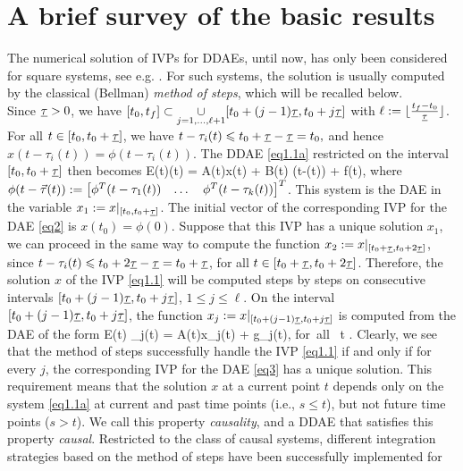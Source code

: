 \documentclass[final,reqno]{siamltex}
\begin{document}
\section{A brief survey of the basic results}
%
The numerical solution of IVPs for DDAEs, until now, has only been considered for square systems, see e.g. 
\cite{AscP95,BakPT02,CamL09,GugH07,Liu99,ShaG06,TiaYK11,ZhuP97,ZhuP98}. 
For such systems, the solution is usually computed by the classical (Bellman) \emph{method of steps}, which will be recalled below.\\
Since $\underline{\tau}>0$, we have $[t_0,t_f] \subset \underset{j=1,\dots,\ell+1}{\cup} [t_0+(j-1)\underline{\tau},t_0+j\underline{\tau}]$ 
with $\ell := \lfloor \frac{t_f-t_0}{\underline{\tau}} \rfloor$.
For all $t \in [t_0,t_0+\underline{\tau}]$, we have $t-\tau_i(t) \leqslant t_0 + \underline{\tau} - \underline{\tau} = t_0,$ and hence $x(t-\tau_i(t)) = \phi(t-\tau_i(t))$.
The DDAE \eqref{eq1.1a} restricted on the interval $[t_0,t_0+\underline{\tau}]$ then becomes
%
\be\label{eq2}
 E(t)(t) = A(t)x(t) + B(t) \phi(t-\vtau(t)) + f(t),
\ee
%
where $\phi(t-\vec{\tau}(t)) := \begin{bmatrix} \phi^T(t-\tau_1(t)) & \dots & \phi^T(t-\tau_k(t)) \end{bmatrix}^T$. 
This system is the DAE in the variable $x_1 := x|_{[t_0,t_0+\underline{\tau}]}$. The initial vector of the corresponding IVP for the DAE \eqref{eq2} is $x(t_0)=\phi(0)$.
Suppose that this IVP has a unique solution $x_1$, we can proceed in the same way to compute the function $x_2 := x|_{[t_0+\underline{\tau},t_0+2\underline{\tau}]}$, since 
$t-\tau_i(t) \leqslant t_0 + 2 \underline{\tau} - \underline{\tau} = t_0+\underline{\tau}$, for all $t\in [t_0+\underline{\tau},t_0+2\underline{\tau}]$. Therefore, the solution $x$ of the IVP \eqref{eq1.1} will be 
computed steps by steps on consecutive intervals $[t_0+(j-1)\underline{\tau},t_0+j\underline{\tau}]$, $1\leq j\leq \ell$. 
On the interval $[t_0+(j-1)\underline{\tau},t_0+j\underline{\tau}]$, the function $x_j := x|_{[t_0+(j-1)\underline{\tau},t_0+j\underline{\tau}]}$ is computed from the DAE of the form
%
\be\label{eq3}
 E(t) _j(t) = A(t)x_j(t) + g_j(t), \quad \mbox{for all } t .
\ee
%
Clearly, we see that the method of steps successfully handle the IVP \eqref{eq1.1} if and only if for every $j$, the corresponding IVP for the 
DAE \eqref{eq3} has a unique solution.
This requirement means that the solution $x$ at a current point $t$ depends only on the system \eqref{eq1.1a} 
at current and past time points (i.e., $s \leq t$), but not future time points ($s > t$). We call this property \emph{causality}, and 
a DDAE that satisfies this property \emph{causal}. 
Restricted to the class of causal systems, different integration strategies based on the method of steps have been successfully implemented for 
\end{document}
